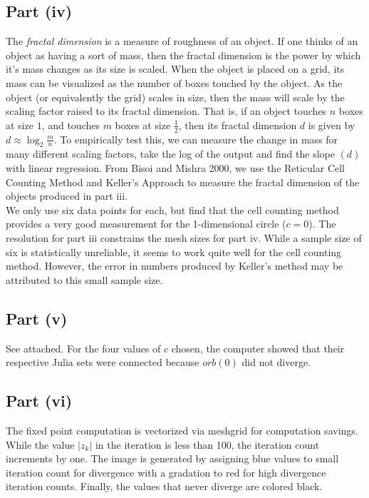 \documentclass[12pt]{article}
\begin{document}
\subsection*{Part (iv)}
The \emph{fractal dimension} is a measure of roughness of an object. If one thinks of an object as having a sort of mass, then the fractal dimension is the power by which it's mass changes as its size is scaled. When the object is placed on a grid, its mass can be visualized as the number of boxes touched by the object. As the object (or equivalently the grid) scales in size, then the mass will scale by the scaling factor raised to its fractal dimension. That is, if an object touches $n$ boxes at size $1$, and touches $m$ boxes at size $\frac{1}{2}$, then its fractal dimension $d$ is given by $d\approx\log_{2}{\frac{m}{n}}$. To empirically test this, we can measure the change in mass for many different scaling factors, take the log of the output and find the slope $\left(d\right)$ with linear regression. From Bisoi and Mishra 2000, we use the Reticular Cell Counting Method and Keller's Approach to measure the fractal dimension of the objects produced in part iii.\\
We only use six data points for each, but find that the cell counting method provides a very good measurement for the 1-dimensional circle ($c=0$). The resolution for part iii constrains the mesh sizes for part iv. While a sample size of six is statistically unreliable, it seems to work quite well for the cell counting method. However, the error in numbers produced by Keller's method may be attributed to this small sample size.
\subsection*{Part (v)}
See attached.
For the four values of $c$ chosen, the computer showed that their respective Julia sets were connected because $orb(0)$ did not diverge.

\subsection*{Part (vi)}
The fixed point computation is vectorized via meshgrid for computation savings.
While the value $|z_k|$ in the iteration is less than 100, the iteration count increments by one.
The image is generated by assigning blue values to small iteration count for divergence with a gradation to red for high divergence iteration counts.
Finally, the values that never diverge are colored black.
\end{document}

